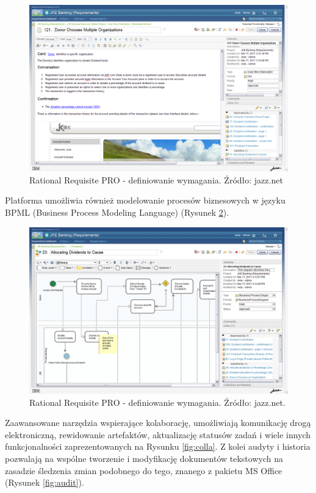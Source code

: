       \begin{figure}[t]
        \centering
        \includegraphics[width=1.0\textwidth]{img/rrc-primary.png}
        \caption{Rational Requisite PRO - definiowanie wymagania. Źródło: jazz.net}
        \label{fig:rrc1}
      \end{figure}

      Platforma umożliwia również modelowanie procesów biznesowych w języku BPML (Business Process Modeling Language) (Rysunek \ref{fig:bpml}).

      \begin{figure}[t]
        \centering
        \includegraphics[width=1.0\textwidth]{img/visually-define.png}
        \caption{Rational Requisite PRO - definiowanie wymagania. Źródło: jazz.net.}
        \label{fig:bpml}
      \end{figure}

      Zaawansowane narzędzia wspierające kolaborację, umożliwiają komunikację drogą elektroniczną, rewidowanie artefaktów, aktualizację statusów zadań i wiele innych funkcjonalności zaprezentowanych na Rysunku \ref{fig:colla}. Z kolei audyty i historia pozwalają na wspólne tworzenie i modyfikację dokumentów tekstowych na zasadzie śledzenia zmian podobnego do tego, znanego z pakietu MS Office (Rysunek \ref{fig:audit}).

